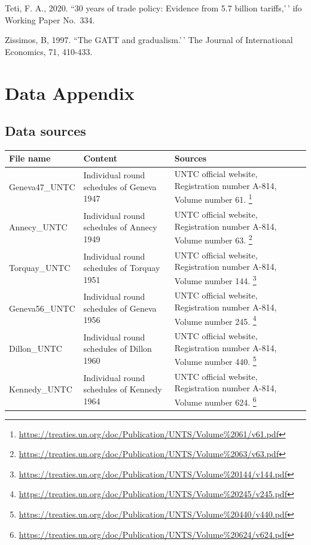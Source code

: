 \documentclass[
  12pt,
]{article}
\begin{document}
Teti, F. A., 2020. ``30 years of trade policy: Evidence from 5.7 billion tariffs,'\,' ifo Working Paper No.~334.

Zissimos, B, 1997. ``The GATT and gradualism.'\,' The Journal of International Economics, 71, 410-433.

\hypertarget{dataappendix}{%
\section{Data Appendix}\label{dataappendix}}

\hypertarget{sources}{%
\subsection{Data sources}\label{sources}}

\begin{longtable}[]{@{}
  >{\raggedright\arraybackslash}p{}
  >{\raggedright\arraybackslash}p{}
  >{\raggedright\arraybackslash}p{}@{}}
\toprule
File name & Content & Sources \\
\midrule
\endhead
Geneva47\_UNTC & Individual round schedules of Geneva 1947 & UNTC official website, Registration number A-814, Volume number 61. \footnote{\url{https://treaties.un.org/doc/Publication/UNTS/Volume\%2061/v61.pdf}} \\
Annecy\_UNTC & Individual round schedules of Annecy 1949 & UNTC official website, Registration number A-814, Volume number 63. \footnote{\url{https://treaties.un.org/doc/Publication/UNTS/Volume\%2063/v63.pdf}} \\
Torquay\_UNTC & Individual round schedules of Torquay 1951 & UNTC official website, Registration number A-814, Volume number 144. \footnote{\url{https://treaties.un.org/doc/Publication/UNTS/Volume\%20144/v144.pdf}} \\
Geneva56\_UNTC & Individual round schedules of Geneva 1956 & UNTC official website, Registration number A-814, Volume number 245. \footnote{\url{https://treaties.un.org/doc/Publication/UNTS/Volume\%20245/v245.pdf}} \\
Dillon\_UNTC & Individual round schedules of Dillon 1960 & UNTC official website, Registration number A-814, Volume number 440. \footnote{\url{https://treaties.un.org/doc/Publication/UNTS/Volume\%20440/v440.pdf}} \\
Kennedy\_UNTC & Individual round schedules of Kennedy 1964 & UNTC official website, Registration number A-814, Volume number 624. \footnote{\url{https://treaties.un.org/doc/Publication/UNTS/Volume\%20624/v624.pdf}} \\

\end{longtable}
\end{document}
